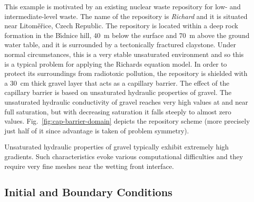\documentclass[final,3p,times,twocolumn]{elsarticle}
\begin{document}
This example is motivated by an existing nuclear waste repository for 
low- and intermediate-level waste. The name of the repository is {\em Richard} and it is situated %
near Litom\v e\v rice, Czech Republic. The repository is located within a deep 
rock formation in the B{\'\i}dnice hill, 40~m below the surface and 70~m above 
the ground water table, and it is  surrounded by a tectonically fractured 
claystone. Under normal circumstances, this is a very stable unsaturated environment 
and so this is a typical problem for applying the Richards equation model. 
In order to protect its surroundings from radiotoxic pollution, the repository is shielded 
with a 30~cm thick gravel layer that acts as a capillary barrier.  
The effect of the capillary barrier is based on unsaturated hydraulic properties of gravel.
The unsaturated hydraulic conductivity of gravel reaches very high values 
at and near full saturation, but with decreasing saturation it falls steeply 
to almost zero values. Fig.~\ref{fig:cap-barrier-domain} depicts the repository 
scheme (more precisely just half of it since advantage is taken of
problem symmetry).

\begin{figure*}[htb!]
    \begin{center} 
    \end{center}
        \caption{Detail of a symmetric half of the domain.}
      \label{fig:cap-barrier-domain}
\end{figure*}

Unsaturated hydraulic properties of gravel typically exhibit
extremely high gradients. Such characteristics evoke various 
computational difficulties and they require very fine meshes 
near the wetting front interface.




\subsection{Initial and Boundary Conditions}
\end{document}
